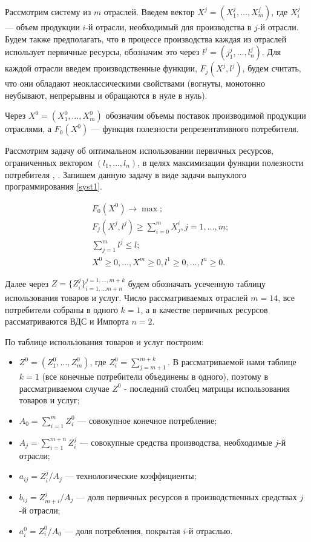 \documentclass[12pt, a4paper]{article}
\begin{document}
Рассмотрим систему из $m$ отраслей. Введем вектор $X^j = (X^j_1, \ldots, X^j_m)$, где $X_i^j$ --- объем продукции $i$-й отрасли, необходимый для производства в $j$-й отрасли. Будем также предполагать, что в процессе производства каждая из отраслей использует первичные ресурсы, обозначим это через $l^j = (j_1^j, \ldots, l_n^j)$. Для каждой отрасли введем производственные функции, $F_j(X^j, l^j)$, будем считать, что они обладают неоклассическими свойствами (вогнуты, монотонно неубывают, непрерывны и обращаются в нуле в нуль).

Через $X^0 = (X^0_1,\ldots, X^0_m)$ обозначим объемы поставок производимой продукции отраслями, а $F_0(X^0)$ --- функция полезности репрезентативного потребителя.

Рассмотрим задачу об оптимальном использовании первичных ресурсов, ограниченных вектором $(l_1, \ldots, l_n)$, в целях максимизации функции полезности потребителя \cite{RassShan}, \cite{AkimovaCourse}. Запишем данную задачу в виде задачи выпуклого программирования \eqref{syst1}.

\begin{equation}\label{syst1}
\begin{aligned}
&F_0(X^0) \rightarrow \max;\\
&F_j(X^j, l^j) \geq \sum\limits_{i=0}^{m}X_j^i, j = 1,\ldots,m;\\
&\sum\limits_{j=1}^m l^j \leq l;\\
&X^0 \geq 0, \ldots, X^m \geq 0, l^1 \geq 0,\ldots,l^n \geq 0. 
\end{aligned}
\end{equation}

Далее через $Z = \{Z_i^j\}_{i=1,\ldots m+n}^{j = 1, \ldots, m+k}$ будем обозначать усеченную таблицу использования товаров и услуг. Число рассматриваемых отраслей $m = 14$, все потребители собраны в одного $k = 1$, а в качестве первичных ресурсов рассматриваются ВДС и Импорта $n = 2$.

По таблице использования товаров и услуг построим:
\begin{itemize}
\item $Z^0 = (Z_1^0, \ldots, Z_m^0)$, где $Z_i^0 = \sum\limits_{j = m + 1}^{m + k}$. В рассматриваемой нами таблице $k = 1$ (все конечные потребители объединены в одного), поэтому в рассматриваемом случае $Z^0$ - последний столбец матрицы использования товаров и услуг;
\item $A_0 = \sum\limits_{i=1}^m Z_i^0$ --- совокупное конечное потребление;
\item $A_j = \sum\limits_{i=1}^{m+n} Z_i^j$ --- совокупные средства производства, необходимые $j$-й отрасли;
\item $a_{ij} = Z_i^j / A_j$ --- технологические коэффициенты;
\item $b_{ij} = Z_{m+i}^j / A_j$ --- доля первичных ресурсов в производственных средствах $j$-й отрасли;
\item $a^0_i = Z_i^0 / A_0$ --- доля потребления, покрытая $i$-й отраслью.
\end{itemize}
\end{document}
